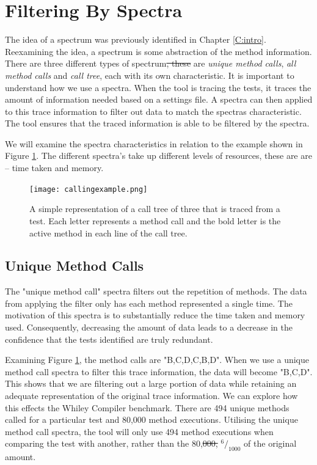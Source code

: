 \documentclass[11pt
              , a4paper
              , twoside
              , openright
              ]{report}
\newcommand*\rfrac[2]{{}^{#1}\!/_{#2}}
\providecommand{\DIFadd}[1]{{\protect\color{blue}\uwave{#1}}} %
\providecommand{\DIFdel}[1]{{\protect\color{red}\sout{#1}}}                      %
\providecommand{\DIFaddbegin}{} %
\providecommand{\DIFaddend}{} %
\providecommand{\DIFdelbegin}{} %
\providecommand{\DIFdelend}{} %
\begin{document}
\section{Filtering By Spectra }
\label{S:spectra}
The idea of a spectrum was previously identified in Chapter \ref{C:intro}. Reexamining the idea, a spectrum is some abstraction of the method information. There are three different types of spectrum\DIFdelbegin \DIFdel{, these }\DIFdelend \DIFaddbegin \DIFadd{. These }\DIFaddend are \textit{unique method calls}, \textit{all method calls} and \textit{call tree}, each with its own characteristic. It is important to understand how we use a spectra. When the tool is tracing the tests, it traces the amount of information needed based on a settings file. A spectra can then applied to this trace information to filter out data to match the spectras characteristic. The tool ensures that the traced information is able to be filtered by the spectra. 

We will examine the spectra characteristics in relation to the example shown in Figure \ref{fig:callingexample}. The different spectra's take up different levels of resources, these are are -- time taken and memory. 


\begin{figure}[h]
\begin{center}
\texttt{[image: callingexample.png]}
\end{center}
\caption{A simple representation of a call tree of three that is traced from a test. Each letter represents a method call and the bold letter is the active method in each line of the call tree.}
\label{fig:callingexample}
\end{figure}

\subsection{Unique Method Calls}
The "unique method call" spectra filters out the repetition of methods. The data from applying the filter only has each method represented a single time. The motivation of this spectra is to substantially reduce the time taken and memory used. Consequently, decreasing the amount of data leads to a decrease in the confidence that the tests identified are truly redundant. 

Examining Figure \ref{fig:callingexample}, the method calls are "B,C,D,C,B,D". When we use a unique method call spectra to filter this trace information, the data will become "B,C,D". This shows that we are filtering out a large portion of data while retaining an adequate representation of the original trace information. We can explore how this effects the Whiley Compiler benchmark. There are 494 unique methods called for a particular test and 80,000 method executions. Utilising the unique method call spectra, the tool will only use 494 method executions when comparing the test with another, rather than the 80,\DIFdelbegin \DIFdel{000, }\DIFdelend \DIFaddbegin \DIFadd{000. This is }\DIFaddend $\rfrac{6}{1000}$ of the original amount. 
\end{document}
